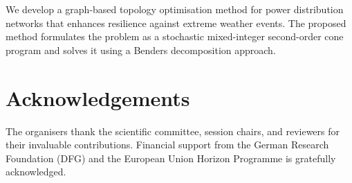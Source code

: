 \documentclass[
    language=english,
    doctype=proceedings,
    institution=none,
]{../../omnilatex}
\begin{document}
We develop a graph-based topology optimisation method for power distribution
networks that enhances resilience against extreme weather events.  The proposed
method formulates the problem as a stochastic mixed-integer second-order cone
program and solves it using a Benders decomposition approach.

\section{Acknowledgements}
The organisers thank the scientific committee, session chairs, and reviewers for
their invaluable contributions.  Financial support from the German Research
Foundation (DFG) and the European Union Horizon Programme is gratefully
acknowledged.

\printbibliography
\end{document}

